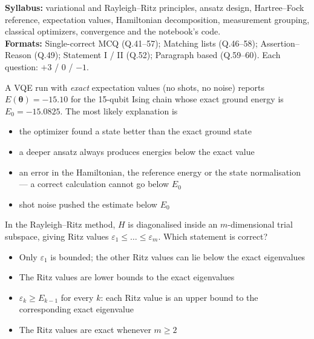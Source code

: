 \documentclass[11pt,a4paper]{article}
\newcommand{\optlabel}[1]{\textbf{(#1)}}
\newenvironment{qitem}[1]{\begin{list}{}{\setlength{\leftmargin}{3.3em}\setlength{\labelwidth}{3.1em}%
  \setlength{\labelsep}{0.2em}\setlength{\topsep}{3pt}\setlength{\parsep}{3pt}}\item[\textbf{Q.#1}\hfill]}{\end{list}}
\newcommand{\qsep}{\par\vspace{2pt}{\color{black!15}\hrule}\vspace{4pt}}
\begin{document}
{\small \textbf{Syllabus:} variational and Rayleigh--Ritz principles, ansatz design, Hartree--Fock reference, expectation values, Hamiltonian decomposition, measurement grouping, classical optimizers, convergence and the notebook's code.\\ \textbf{Formats:} Single-correct MCQ (Q.41--57); Matching lists (Q.46--58); Assertion--Reason (Q.49); Statement I / II (Q.52); Paragraph based (Q.59--60). Each question: $+3$ / $0$ / $-1$.}
\par\medskip

\begin{qitem}{41}
A VQE run with \emph{exact} expectation values (no shots, no noise) reports $E(\boldsymbol\theta) = -15.10$ for the 15-qubit Ising chain whose exact ground
energy is $E_0 = -15.0825$. The most likely explanation is
\begin{itemize}[leftmargin=2.6em, labelsep=0.4em, itemsep=2pt, topsep=3pt]
\item[\optlabel{A}] the optimizer found a state better than the exact ground state
\item[\optlabel{B}] a deeper ansatz always produces energies below the exact value
\item[\optlabel{C}] an error in the Hamiltonian, the reference energy or the state normalisation --- a correct calculation cannot go below $E_0$
\item[\optlabel{D}] shot noise pushed the estimate below $E_0$
\end{itemize}
\end{qitem}
\qsep

\begin{qitem}{42}
In the Rayleigh--Ritz method, $H$ is diagonalised inside an $m$-dimensional trial subspace, giving Ritz values $\varepsilon_1 \le \dots \le \varepsilon_m$. Which
statement is correct?
\begin{itemize}[leftmargin=2.6em, labelsep=0.4em, itemsep=2pt, topsep=3pt]
\item[\optlabel{A}] Only $\varepsilon_1$ is bounded; the other Ritz values can lie below the exact eigenvalues
\item[\optlabel{B}] The Ritz values are lower bounds to the exact eigenvalues
\item[\optlabel{C}] $\varepsilon_k \ge E_{k-1}$ for every $k$: each Ritz value is an upper bound to the corresponding exact eigenvalue
\item[\optlabel{D}] The Ritz values are exact whenever $m \ge 2$
\end{itemize}
\end{qitem}
\qsep
\end{document}
